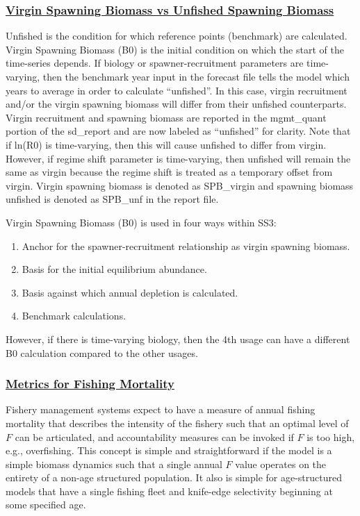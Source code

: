 \subsubsection[Virgin Spawning Biomass vs Unfished Spawning Biomass]{\protect\hyperlink{}{Virgin Spawning Biomass vs Unfished Spawning Biomass}}
Unfished is the condition for which reference points (benchmark) are calculated. Virgin Spawning Biomass (B0) is the initial condition on which the start of the time-series depends. If biology or spawner-recruitment parameters are time-varying, then the benchmark year input in the forecast file tells the model which years to average in order to calculate ``unfished''. In this case, virgin recruitment and/or the virgin spawning biomass will differ from their unfished counterparts. Virgin recruitment and spawning biomass are reported in the mgmt\_quant portion of the sd\_report and are now labeled as ``unfished'' for clarity. Note that if ln(R0) is time-varying, then this will cause unfished to differ from virgin. However, if regime shift parameter is time-varying, then unfished will remain the same as virgin because the regime shift is treated as a temporary offset from virgin. Virgin spawning biomass is denoted as SPB\_virgin and spawning biomass unfished is denoted as SPB\_unf in the report file.

Virgin Spawning Biomass (B0) is used in four ways within SS3:
\begin{enumerate}
	\item Anchor for the spawner-recruitment relationship as virgin spawning biomass.
	\item Basis for the initial equilibrium abundance. 
	\item Basis against which annual depletion is calculated.
	\item Benchmark calculations.
\end{enumerate}
However, if there is time-varying biology, then the 4th usage can have a different B0 calculation compared to the other usages.

\hypertarget{FMortality}{}
\subsubsection[Metrics for Fishing Mortality]{\protect\hyperlink{FMortality}{Metrics for Fishing Mortality}}
Fishery management systems expect to have a measure of annual fishing mortality that describes the intensity of the fishery such that an optimal level of $F$ can be articulated, and accountability measures can be invoked if $F$ is too high, e.g., overfishing. This concept is simple and straightforward if the model is a simple biomass dynamics such that a single annual $F$ value operates on the entirety of a non-age structured population. It also is simple for age-structured models that have a single fishing fleet and knife-edge selectivity beginning at some specified age.

